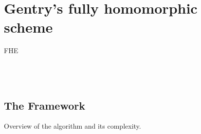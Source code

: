 \documentclass{acm_proc_article-sp}
\begin{document}
\section{Gentry's fully homomorphic scheme}
 FHE\\\\\\\
\subsection{The Framework}
Overview of the algorithm and its complexity. 
 \\\\\\\\\\\\\\\\\\\\\\\\\\\\\\\\\\\\\\\\\\\\\\\\\\\\\\\\
\end{document}
